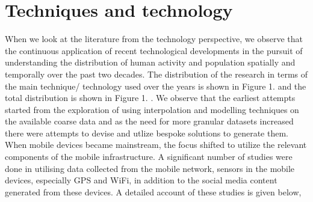 \section{Techniques and technology}

When we look at the literature from the technology perspective, we observe that the continuous application of recent technological developments in the pursuit of understanding the distribution of human activity and population spatially and temporally over the past two decades.
The distribution of the research in terms of the main technique/ technology used over the years is shown in Figure 1.
 and the total distribution is shown in Figure 1.
. We observe that the earliest attempts started from the exploration of using interpolation and modelling techniques on the available coarse data and as the need for more granular datasets increased there were attempts to devise and utlize bespoke solutions to generate them.
When mobile devices became mainstream, the focus shifted to utilize the relevant components of the mobile infrastructure.
A significant number of studies were done in utilising data collected from the mobile network, sensors in the mobile devices, especially GPS and WiFi, in addition to the social media content generated from these devices.
A detailed account of these studies is given below,
